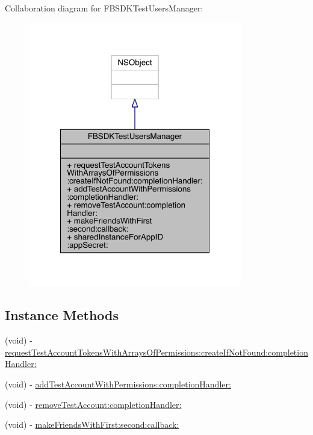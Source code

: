 Collaboration diagram for F\-B\-S\-D\-K\-Test\-Users\-Manager\-:
\nopagebreak
\begin{figure}[H]
\begin{center}
\leavevmode
\includegraphics[width=264pt]{interface_f_b_s_d_k_test_users_manager__coll__graph}
\end{center}
\end{figure}
\subsection*{Instance Methods}
\begin{DoxyCompactItemize}
\item 
(void) -\/ \hyperlink{interface_f_b_s_d_k_test_users_manager_a112c6b79b6abb30dd84460d20b1e0e52}{request\-Test\-Account\-Tokens\-With\-Arrays\-Of\-Permissions\-:create\-If\-Not\-Found\-:completion\-Handler\-:}
\item 
(void) -\/ \hyperlink{interface_f_b_s_d_k_test_users_manager_a2b6f759bb6df5a0e48be766249bd39b9}{add\-Test\-Account\-With\-Permissions\-:completion\-Handler\-:}
\item 
(void) -\/ \hyperlink{interface_f_b_s_d_k_test_users_manager_a10eedbc811e46c6daa646c1e033a3409}{remove\-Test\-Account\-:completion\-Handler\-:}
\item 
(void) -\/ \hyperlink{interface_f_b_s_d_k_test_users_manager_ab1f541d7dda83422878e8478a76e1ae0}{make\-Friends\-With\-First\-:second\-:callback\-:}
\end{DoxyCompactItemize}
